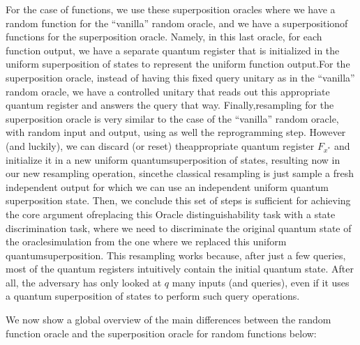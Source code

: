 \documentclass[12pt]{article}
\begin{document}
    For the case of functions, we use these superposition oracles where we have a random function for the ``vanilla'' random oracle, and we have a superposition\break of functions for the superposition oracle. Namely, in this last oracle, for each function output, we have a separate quantum register that is initialized in the uniform superposition of states to represent the uniform function output.\break For the superposition oracle, instead of having this fixed query unitary as in the ``vanilla'' random oracle, we have a controlled unitary that reads out this appropriate quantum register and answers the query that way. Finally,\break resampling for the superposition oracle is very similar to the case of the ``vanilla'' random oracle, with random input and output, using as well the reprogramming step. However (and luckily), we can discard (or reset) the\break appropriate quantum register ${F}_{{x}^{*}}$ and initialize it in a new uniform quantum\break superposition of states, resulting now in our new resampling operation, since\break the classical resampling is just sample a fresh independent output for which we can use an independent uniform quantum superposition state. Then, we conclude this set of steps is sufficient for achieving the core argument of\break replacing this Oracle distinguishability task with a state discrimination task, where we need to discriminate the original quantum state of the oracle\break simulation from the one where we replaced this uniform quantum\break superposition. This resampling works because, after just a few queries, most of the quantum registers intuitively contain the initial quantum state. After all, the adversary has only looked at $q$ many inputs (and queries), even if it uses a quantum superposition of states to perform such query operations. 
    
    \clearpage

    
    \vspace{-4ex}
    \noindent We now show a global overview of the main differences between the random function oracle and the superposition oracle for random functions below:
    
\end{document}
